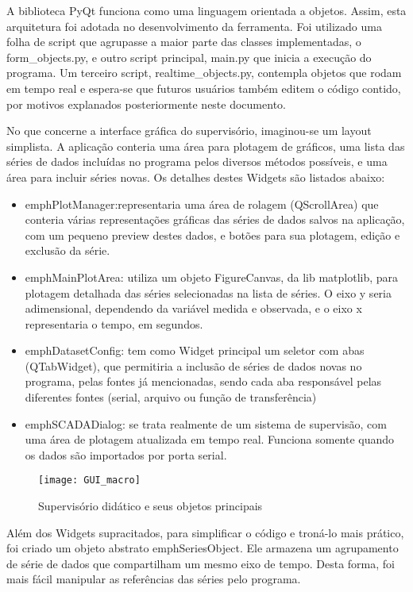 A biblioteca PyQt funciona como uma linguagem orientada a objetos. Assim, esta arquitetura foi adotada no desenvolvimento da ferramenta. Foi utilizado uma folha de script que agrupasse a maior parte das classes implementadas, o form\_objects.py, e outro script principal, main.py que inicia a execução do programa. Um terceiro script, realtime\_objects.py, contempla objetos que rodam em tempo real e espera-se que futuros usuários também editem o código contido, por motivos explanados posteriormente neste documento.

No que concerne a interface gráfica do supervisório, imaginou-se um layout simplista. A aplicação conteria uma área para plotagem de gráficos, uma lista das séries de dados incluídas no programa pelos diversos métodos possíveis, e uma área para incluir séries novas. Os detalhes destes Widgets são listados abaixo:

\begin{itemize}
	\item emph{PlotManager}:representaria uma área de rolagem (QScrollArea) que conteria várias representações gráficas das séries de dados salvos na aplicação, com um pequeno preview destes dados, e botões para sua plotagem, edição e exclusão da série.
	\item emph{MainPlotArea}: utiliza um objeto FigureCanvas, da lib matplotlib, para plotagem detalhada das séries selecionadas na lista de séries. O eixo y seria adimensional, dependendo da variável medida e observada, e o eixo x representaria o tempo, em segundos.
	\item emph{DatasetConfig}: tem como Widget principal um seletor com abas (QTabWidget), que permitiria a inclusão de séries de dados novas no programa, pelas fontes já mencionadas, sendo cada aba responsável pelas diferentes fontes (serial, arquivo ou função de transferência)
	\item emph{SCADADialog}: se trata realmente de um sistema de supervisão, com uma área de plotagem atualizada em tempo real. Funciona somente quando os dados são importados por porta serial.
\end{itemize}

\begin{figure}
	\centering
	\texttt{[image: GUI\_macro]}
	\caption{Supervisório didático e seus objetos principais}
	\label{img_gui_macro}
\end{figure}

Além dos Widgets supracitados, para simplificar o código e troná-lo mais prático, foi criado um objeto abstrato emph{SeriesObject}. Ele armazena um agrupamento de série de dados que compartilham um mesmo eixo de tempo. Desta forma, foi mais fácil manipular as referências das séries pelo programa.

